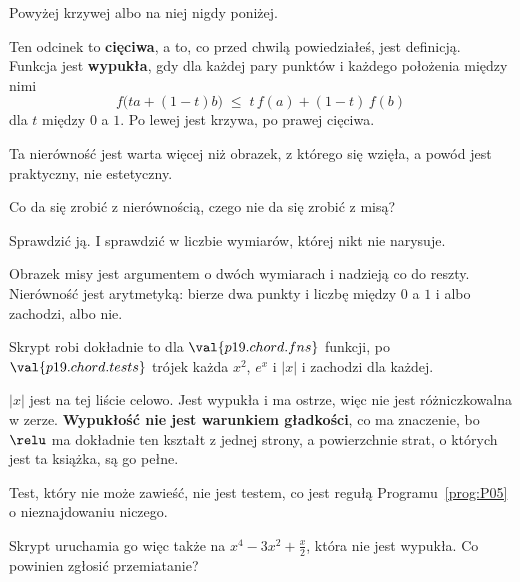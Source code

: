 \begin{fr}
\begin{ansblock}
Powyżej krzywej albo na niej \dash{} nigdy poniżej.
\end{ansblock}

Ten odcinek to \textbf{cięciwa}, a to, co przed chwilą powiedziałeś, jest
definicją. Funkcja jest \textbf{wypukła}, gdy dla każdej pary punktów i
każdego położenia między nimi
\[ f\bigl(t a + (1-t)b\bigr) \;\le\; t\,f(a) + (1-t)\,f(b) \]
dla $t$ między $0$ a $1$. Po lewej jest krzywa, po prawej cięciwa.

\end{fr}

\begin{fr}
Ta nierówność jest warta więcej niż obrazek, z którego się wzięła, a powód
jest praktyczny, nie estetyczny.

Co da się zrobić z nierównością, czego nie da się zrobić z misą?
\nextframe
\end{fr}

\begin{fr}
\begin{ansblock}
Sprawdzić ją. I sprawdzić w liczbie wymiarów, której nikt nie narysuje.
\end{ansblock}

Obrazek misy jest argumentem o dwóch wymiarach i nadzieją co do reszty.
Nierówność jest arytmetyką: bierze dwa punkty i liczbę między $0$ a $1$ i albo
zachodzi, albo nie.

Skrypt robi dokładnie to dla $\val{p19.chord.fns}$ funkcji, po
$\val{p19.chord.tests}$ trójek każda \dash{} $x^{2}$, $e^{x}$ i
$\lvert x \rvert$ \dash{} i zachodzi dla każdej.

\begin{note}
$\lvert x \rvert$ jest na tej liście celowo. Jest wypukła i ma ostrze, więc
nie jest różniczkowalna w zerze. \textbf{Wypukłość nie jest warunkiem
gładkości}, co ma znaczenie, bo $\relu$ ma dokładnie ten kształt z jednej
strony, a powierzchnie strat, o których jest ta książka, są go pełne.
\end{note}
\end{fr}

\begin{fr}
Test, który nie może zawieść, nie jest testem, co jest regułą
Programu~\ref{prog:P05} o nieznajdowaniu niczego.

Skrypt uruchamia go więc także na $x^{4} - 3x^{2} + \frac{x}{2}$, która nie
jest wypukła. Co powinien zgłosić przemiatanie?
\dotline
\nextframe
\end{fr}

